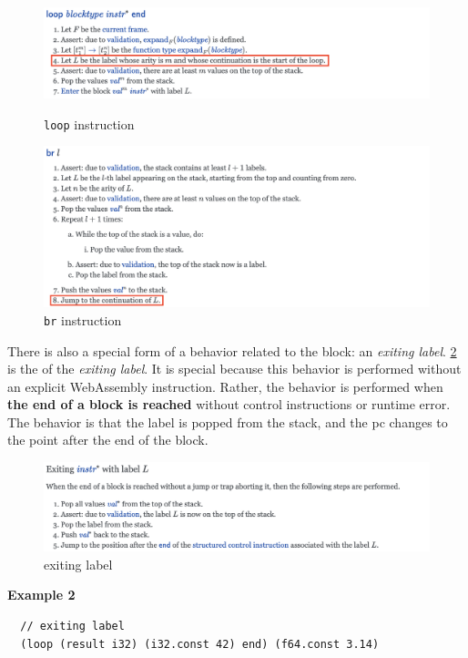 \begin{figure}[h!]
    \centerline{\includegraphics[width=15cm]{fig/loop}}
    \caption[Enter the caption title here]{\texttt{loop} instruction} \label{fig:loop}
    \centerline{\includegraphics[width=15cm]{fig/br}}
    \caption[Enter the caption title here]{\texttt{br} instruction} \label{fig:br}
\end{figure}


There is also a special form of a behavior related to the block: an
\textit{exiting label}.
\cref{fig:exiting-label} is the \officialp{} of the \textit{exiting label}.
It is special because this behavior is performed without an explicit
WebAssembly instruction.
Rather, the behavior is performed when \textbf{the end of a block is reached}
without control instructions or runtime error.
The behavior is that the label is popped from the stack, and the pc changes to
the point after the end of the block.

\begin{figure}[h!]
    \centerline{\includegraphics[width=15cm]{fig/exiting}}
    \caption[Enter the caption title here]{exiting label} \label{fig:exiting-label}
\end{figure}


\textbf{Example 2}
\begin{verbatim}
  // exiting label
  (loop (result i32) (i32.const 42) end) (f64.const 3.14)
\end{verbatim}

